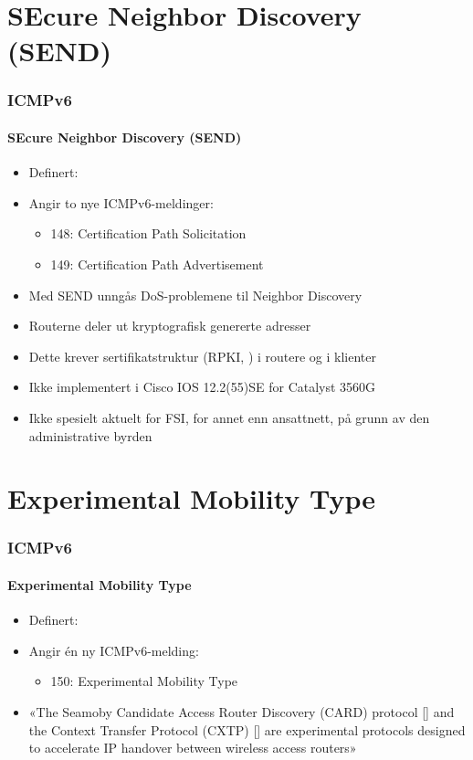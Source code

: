 \section{SEcure Neighbor Discovery (SEND)}
\begin{frame}%
  \frametitle{ICMPv6}
  \framesubtitle{SEcure Neighbor Discovery (SEND)}
  \begin{itemize}%
  \item Definert: 
  \item Angir to nye ICMPv6-meldinger:
    \begin{itemize}%
    \item 148: Certification Path Solicitation
    \item 149: Certification Path Advertisement
    \end{itemize}
  \item Med SEND unngås DoS-problemene til Neighbor Discovery
  \item Routerne deler ut kryptografisk genererte adresser 
  \item Dette krever sertifikatstruktur (RPKI, ) i routere og i klienter
  \item Ikke implementert i Cisco IOS 12.2(55)SE for Catalyst 3560G
  \item Ikke spesielt aktuelt for FSI, for annet enn ansattnett, på
    grunn av den administrative byrden
  \end{itemize}
\end{frame}

\section{Experimental Mobility Type}
\begin{frame}%
  \frametitle{ICMPv6}
  \framesubtitle{Experimental Mobility Type}
  \begin{itemize}%
  \item Definert: 
  \item Angir én ny ICMPv6-melding:
    \begin{itemize}%
    \item 150: Experimental Mobility Type
    \end{itemize}
  \item «The Seamoby Candidate Access Router Discovery (CARD) protocol
    [] and the Context Transfer Protocol (CXTP) []
    are experimental protocols designed to accelerate IP handover
    between wireless access routers»
  \end{itemize}
\end{frame}

